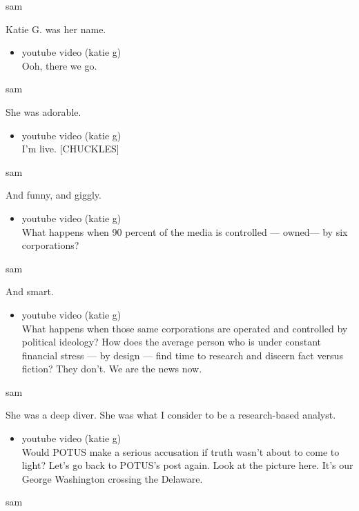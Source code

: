 sam

Katie G. was her name.

\begin{itemize}
\tightlist
\item
  youtube video (katie g)\\
  Ooh, there we go.
\end{itemize}

sam

She was adorable.

\begin{itemize}
\tightlist
\item
  youtube video (katie g)\\
  I'm live. {[}CHUCKLES{]}
\end{itemize}

sam

And funny, and giggly.

\begin{itemize}
\tightlist
\item
  youtube video (katie g)\\
  What happens when 90 percent of the media is controlled --- owned---
  by six corporations?
\end{itemize}

sam

And smart.

\begin{itemize}
\tightlist
\item
  youtube video (katie g)\\
  What happens when those same corporations are operated and controlled
  by political ideology? How does the average person who is under
  constant financial stress --- by design --- find time to research and
  discern fact versus fiction? They don't. We are the news now.
\end{itemize}

sam

She was a deep diver. She was what I consider to be a research-based
analyst.

\begin{itemize}
\tightlist
\item
  youtube video (katie g)\\
  Would POTUS make a serious accusation if truth wasn't about to come to
  light? Let's go back to POTUS's post again. Look at the picture here.
  It's our George Washington crossing the Delaware.
\end{itemize}

sam

